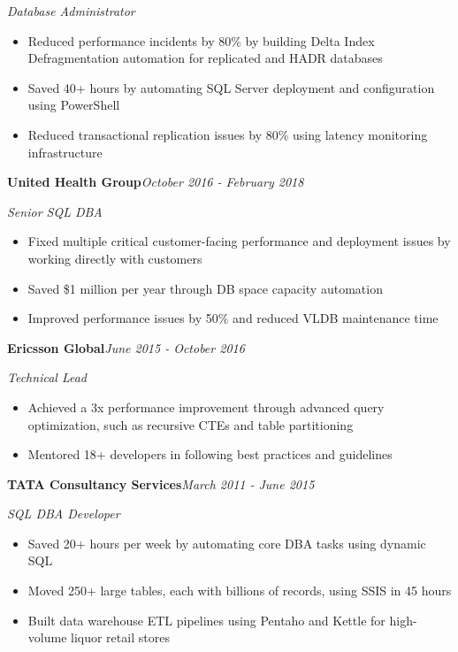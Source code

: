 \documentclass[10pt,a4paper]{article}
\begin{document}
\textit{Database Administrator}\\[-5pt]
\begin{itemize}
  \item Reduced performance incidents by 80\% by building Delta Index Defragmentation automation for replicated and HADR databases
  \item Saved 40+ hours by automating SQL Server deployment and configuration using PowerShell
  \item Reduced transactional replication issues by 80\% using latency monitoring infrastructure
\end{itemize}
\vspace{14.7pt}
\noindent\textbf{United Health Group}\hfill \textit{October 2016 - February 2018}

\textit{Senior SQL DBA}\\[-5pt]
\begin{itemize}
  \item Fixed multiple critical customer-facing performance and deployment issues by working directly with customers
  \item Saved \$1 million per year through DB space capacity automation
  \item Improved performance issues by 50\% and reduced VLDB maintenance time
\end{itemize}
\vspace{14.7pt}
\noindent\textbf{Ericsson Global}\hfill \textit{June 2015 - October 2016}

\textit{Technical Lead}\\[-5pt]
\begin{itemize}
  \item Achieved a 3x performance improvement through advanced query optimization, such as recursive CTEs and table partitioning
  \item Mentored 18+ developers in following best practices and guidelines
\end{itemize}
\vspace{14.7pt}
\noindent\textbf{TATA Consultancy Services}\hfill \textit{March 2011 - June 2015}

\textit{SQL DBA Developer}\\[-5pt]
\begin{itemize}
  \item Saved 20+ hours per week by automating core DBA tasks using dynamic SQL
  \item Moved 250+ large tables, each with billions of records, using SSIS in 45 hours
  \item Built data warehouse ETL pipelines using Pentaho and Kettle for high-volume liquor retail stores
\end{itemize}
\end{document}
